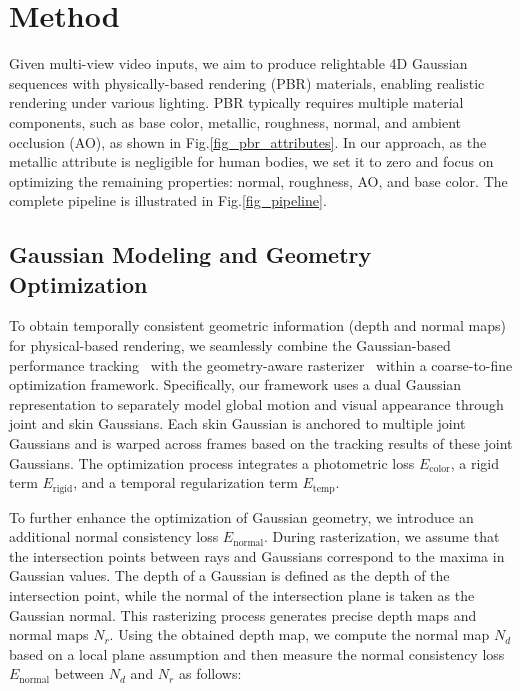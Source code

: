 

\section{Method}

Given multi-view video inputs, we aim to produce relightable 4D Gaussian sequences with physically-based rendering (PBR) materials, enabling realistic rendering under various lighting. PBR typically requires multiple material components, such as base color, metallic, roughness, normal, and ambient occlusion (AO), as shown in Fig.\ref{fig_pbr_attributes}. In our approach, 
as the metallic attribute is negligible for human bodies, we set it to zero and focus on optimizing the remaining properties: normal, roughness, AO, and base color. The complete pipeline is illustrated in Fig.\ref{fig_pipeline}.









\subsection{Gaussian Modeling and Geometry Optimization}
\label{sec_3_1}

To obtain temporally consistent geometric information (depth and normal maps) for physical-based rendering, we seamlessly combine the Gaussian-based performance tracking~\cite{jiang2024robust} with the geometry-aware rasterizer~\cite{zhang2024rade} within a coarse-to-fine optimization framework. Specifically, our framework uses a dual Gaussian representation to separately model global motion and visual appearance through joint and skin Gaussians. Each skin Gaussian is anchored to multiple joint Gaussians and is warped across frames based on the tracking results of these joint Gaussians. The optimization process integrates a photometric loss $E_{\text{color}}$, a rigid term $E_{\text{rigid}}$, and a temporal regularization term $E_{\text{temp}}$. 

To further enhance the optimization of Gaussian geometry, we introduce an additional normal consistency loss $E_{\text{normal}}$. During rasterization, we assume that the intersection points between rays and Gaussians correspond to the maxima in Gaussian values. The depth of a Gaussian is defined as the depth of the intersection point, while the normal of the intersection plane is taken as the Gaussian normal. This rasterizing process generates precise depth maps and normal maps $N_r$. Using the obtained depth map, we compute the normal map $N_d$ based on a local plane assumption and then measure the normal consistency loss $E_{\text{normal}}$ between $N_d$ and $N_r$ as follows:









